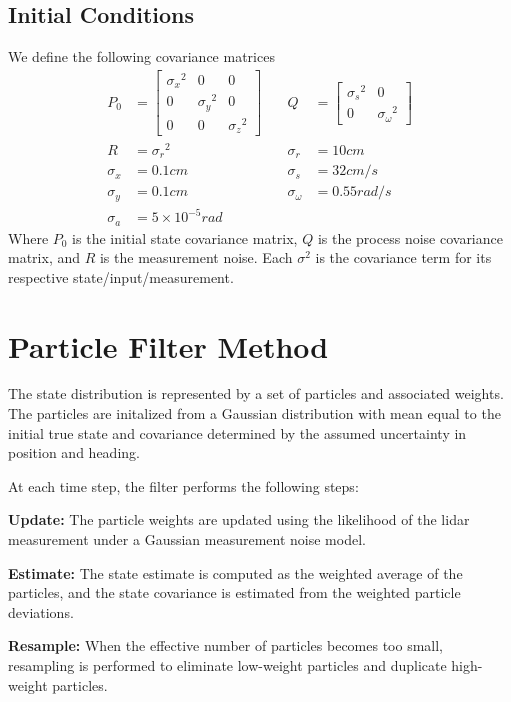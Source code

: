 \documentclass[11pt, letterpaper, twocolumn]{article}
\begin{document}
\subsection*{Initial Conditions}

We define the following covariance matrices
\[\begin{aligned}
P_0 &= \begin{bmatrix}
    {\sigma_x}^2 & 0 & 0 \\
    0 & {\sigma_y}^2 & 0 \\
    0 & 0 & {\sigma_z}^2
\end{bmatrix} &\quad Q &= \begin{bmatrix}
    {\sigma_s}^2 & 0 \\
    0 & {\sigma_{\omega}}^2
\end{bmatrix} \\ 
R &= {\sigma_r}^2 &\quad \sigma_r &= 10 cm \\
\sigma_x &= 0.1 cm &\quad \sigma_s &= 32 cm/s \\
\sigma_y &= 0.1 cm &\quad \sigma_{\omega} &= 0.55 rad/s \\
\sigma_a &= 5\times10^{-5} rad   
\end{aligned}  
\]
Where $P_0$ is the initial state covariance matrix, $Q$ is the process noise covariance
matrix, and $R$ is the measurement noise. Each $\sigma^2$ is the covariance term for 
its respective state/input/measurement.

\section*{Particle Filter Method}

The state distribution is represented by a set of particles and associated weights. The
particles are initalized from a Gaussian distribution with mean equal to the initial 
true state and covariance determined by the assumed uncertainty in position and heading.

At each time step, the filter performs the following steps:

\textbf{Update:} The particle weights are updated using the likelihood of the lidar 
measurement under a Gaussian measurement noise model.

\textbf{Estimate:} The state estimate is computed as the weighted average of the particles,
and the state covariance is estimated from the weighted particle deviations.

\textbf{Resample:} When the effective number of particles becomes too small, resampling is
performed to eliminate low-weight particles and duplicate high-weight particles.
\end{document}
